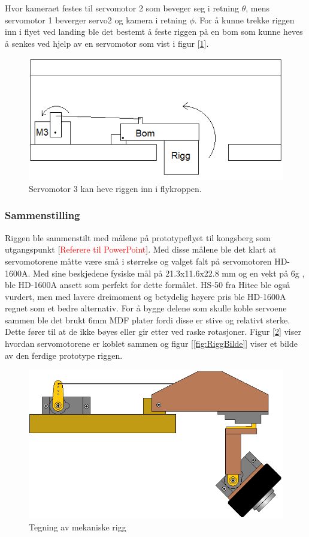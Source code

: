 Hvor kameraet festes til servomotor 2 som beveger seg i retning $\theta$, mens servomotor 1 beverger servo2 og kamera i retning $\phi$. For å kunne trekke riggen inn i flyet ved landing ble det bestemt å feste riggen på en bom som kunne heves å senkes ved hjelp av en servomotor som vist i figur [\ref{fig:bom}].

\begin{figure}[h!]
	\centering
	\includegraphics[scale=0.5]{img/Motor3.png}
	\caption{Servomotor 3 kan heve riggen inn i flykroppen.}
	\label{fig:bom}
\end{figure}


\subsubsection{Sammenstilling}
Riggen ble sammenstilt med målene på prototypeflyet til kongsberg som utgangspunkt [\textcolor{red}{Referere til PowerPoint}]. Med disse målene ble det klart at servomotorene måtte være små i størrelse og valget falt på servomotoren HD-1600A. Med sine beskjedene fysiske mål på 21.3x11.6x22.8 mm og en vekt på 6g \cite{PowerHD}, ble HD-1600A ansett som perfekt for dette formålet. HS-50 fra Hitec ble også vurdert, men med lavere dreimoment og betydelig høyere pris ble HD-1600A regnet som et bedre alternativ. For å bygge delene som skulle koble servoene sammen ble det brukt 6mm MDF plater fordi disse er stive og relativt sterke. Dette fører til at de ikke bøyes eller gir etter ved raske rotasjoner. Figur [\ref{fig:RiggTegn}] viser hvordan servomotorene er koblet sammen og figur [\ref{fig:RiggBilde}] viser et bilde av den ferdige prototype riggen. 

\begin{figure}[h!]
	\centering
	\includegraphics[scale=0.5]{img/RIGG_sattsammen.png}
	\caption{Tegning av mekaniske rigg}
	\label{fig:RiggTegn}
\end{figure}

